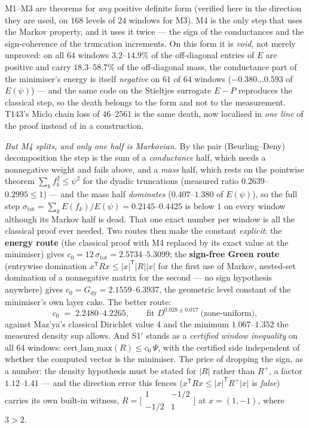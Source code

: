 \documentclass[11pt,a4paper]{article}
\begin{document}
\noindent M1--M3 are theorems for \emph{any} positive definite form (verified here in the
direction they are used, on $168$ levels of $24$ windows for M3). M4 is the only step that uses
the Markov property, and it uses it twice --- the sign of the conductances and the
sign-coherence of the truncation increments. On this form it is \emph{void}, not merely
unproved: on all $64$ windows $3.2$--$14.9\%$ of the off-diagonal entries of $E$ are positive
and carry $18.3$--$58.7\%$ of the off-diagonal mass, the conductance part of the minimiser's
energy is itself \emph{negative} on $61$ of $64$ windows ($-0.380\ldots0.593$ of $E(\psi)$) ---
and the same code on the Stieltjes surrogate $E-P$ reproduces the classical step, so the death
belongs to the form and not to the measurement. T143's Miclo chain loss of $46$--$2561$ is the
same death, now localised in \emph{one line} of the proof instead of in a construction.

\emph{But M4 splits, and only one half is Markovian.} By the pair (Beurling--Deny)
decomposition the step is the sum of a \emph{conductance} half, which needs a nonnegative
weight and fails above, and a \emph{mass} half, which rests on the pointwise theorem
$\sum_kf_{k}^2\le\psi^2$ for the dyadic truncations (measured ratio $0.2639$--$0.2995\le1$) ---
and the mass half \emph{dominates} ($0.407$--$1.380$ of $E(\psi)$), so the full step
$\sigma_{\mathrm{tot}}=\sum_kE(f_k)/E(\psi)=0.2145$--$0.4425$ is below $1$ on every window
although its Markov half is dead. That one exact number per window is all the classical proof
ever needed. Two routes then make the constant \emph{explicit}: the \textbf{energy route}
(the classical proof with M4 replaced by its exact value at the minimiser) gives
$c_0=12\,\sigma_{\mathrm{tot}}=2.5734$--$5.3099$; the \textbf{sign-free Green route}
(entrywise domination $x^{\mathsf T}Rx\le|x|^{\mathsf T}|R||x|$ for the first use of Markov,
nested-set domination of a nonnegative matrix for the second --- no sign hypothesis anywhere)
gives $c_0=G_{\mathrm{dy}}=2.1559$--$6.3937$, the geometric level constant of the minimiser's
own layer cake. The better route:
\[
c_0 \;=\; 2.2480\text{--}4.2265,\qquad \text{fit } D^{0.028\pm0.017}\ \text{(zone-uniform)},
\]
against Maz'ya's classical Dirichlet value $4$ and the minimum $1.067$--$1.352$ the measured
density sup allows. And S1$'$ stands as a \emph{certified window inequality} on all $64$
windows: $\mathrm{cert\_lam\_max}(R)\le c_0\,\Psi$, with the certified side independent of
whether the computed vector is the minimiser. The price of dropping the sign, as a number: the
density hypothesis must be stated for $|R|$ rather than $R^{+}$, a factor $1.12$--$1.41$ ---
and the direction error this fences ($x^{\mathsf T}Rx\le|x|^{\mathsf T}R^{+}|x|$ is \emph{false})
carries its own built-in witness,
$R=\bigl[\begin{smallmatrix}1&-1/2\\-1/2&1\end{smallmatrix}\bigr]$ at $x=(1,-1)$, where
$3>2$.
\end{document}
